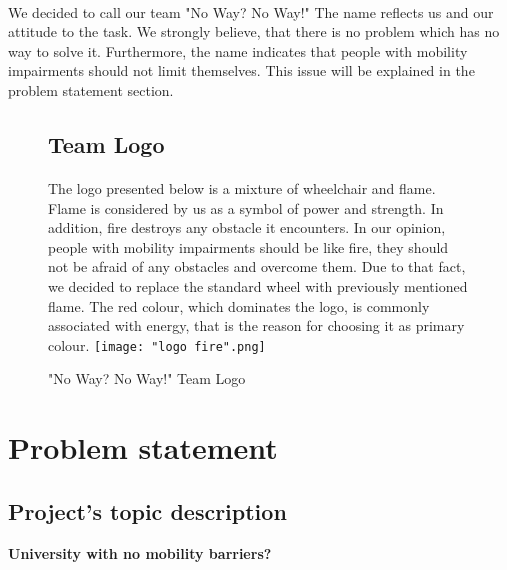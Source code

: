 \documentclass[12pt]{article}
\begin{document}
\paragraph{} We decided to call our team "No Way? No Way!" The name reflects us and our attitude to the task. We strongly believe, that there is no problem which has no way to solve it. Furthermore, the name indicates that people with mobility impairments should not limit themselves. This issue will be explained in the problem statement section.

\newpage

\begin{figure}[H]
\subsection{Team Logo}
\paragraph{}The logo presented below is a mixture of wheelchair and flame. Flame is considered by us as a symbol of power and strength. In addition, fire destroys any obstacle it encounters. In our opinion, people with mobility impairments should be like fire, they should not be afraid of any obstacles and overcome them. Due to that fact, we decided to replace the standard wheel with previously mentioned flame. The red colour, which dominates the logo, is commonly associated with energy, that is the reason for choosing it as primary colour.
\texttt{[image: "logo fire".png]}
\caption{"No Way? No Way!" Team Logo}
\label{fig:logo}
\end{figure}


\section{Problem statement}
\subsection{Project's topic description}
\textbf{University with no mobility barriers?} \\\\
\end{document}
